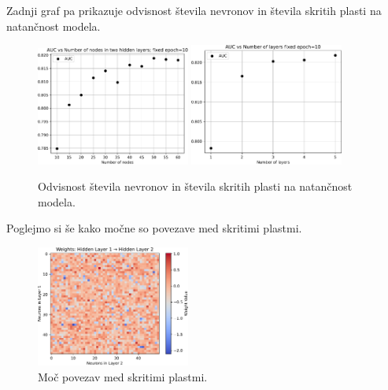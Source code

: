 Zadnji graf pa prikazuje odvisnost števila nevronov in števila skritih plasti na natančnost modela.
\begin{figure}
    \centering
    \includegraphics[width=0.45\textwidth]{../pdf/nn/auc_vs_nodes.pdf}
    \includegraphics[width=0.45\textwidth]{../pdf/nn/auc_vs_layers.pdf}
    \caption{Odvisnost števila nevronov in števila skritih plasti na natančnost modela.\label{fig:nn-nodes-layers}}
\end{figure}
\newpage
Poglejmo si še kako močne so povezave med skritimi plastmi.
\begin{figure}
    \centering
    \includegraphics[width=0.45\textwidth]{../pdf/nn/weights_heatmap.pdf}
    \caption{Moč povezav med skritimi plastmi.\label{fig:nn-weights}}
\end{figure}